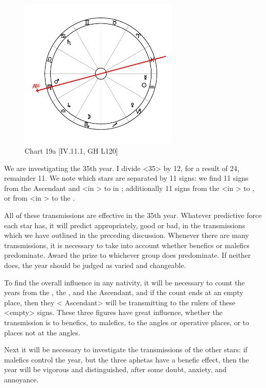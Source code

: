 \clearpage
\begin{figure}
\centering
\vspace{-20pt}
\includegraphics[width=0.68\textwidth]{charts/4_11_1}
\caption{Chart 19a [IV.11.1, GH L120]}
\label{fig:chart19a}
\end{figure} 

We are investigating the 35th year. I divide <35> by 12,
for a result of 24, remainder 11. We note which stars are separated by 11 signs: we find 11 signs from the Ascendant and \Mars\xspace <in \Virgo> to \Saturn\xspace in \Cancer; additionally 11 signs from the \Moon\xspace <in \Scorpio> to \Mars, or from \Venus\xspace <in \Capricorn> to the \Moon. 

All of these transmissions are effective in the 35th year.
Whatever predictive force each star has, it will predict appropriately, good or bad, in the transmissions which we have outlined in the preceding discussion. Whenever there are many transmissions, it is necessary to take into account whether benefics or malefics predominate. Award the prize to whichever group does predominate. If neither does, the year should be judged as varied and changeable.

To find the overall influence in any nativity, it will be necessary to count the years from the \Sun, the \Moon, and the Ascendant, and if the count ends at an empty place, then they <\Sun\xspace \Moon\xspace Ascendant> will be transmitting to the rulers of these <empty> signs. These three figures have great influence, whether the transmission is to benefics, to malefics, to the angles or operative places, or to places not at the angles.

Next it will be necessary to investigate the transmissions of the other stars: if malefics control the year, but the three aphetas have a benefic effect, then the year will be vigorous and distinguished, after some doubt, anxiety, and annoyance.


